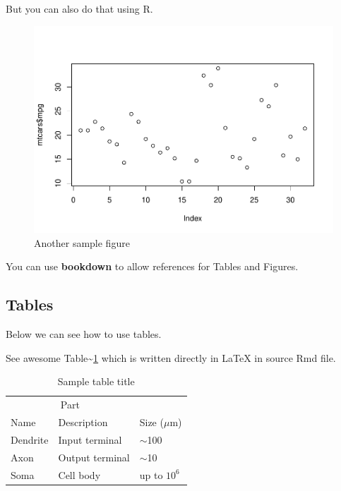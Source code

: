 \documentclass{article}
\newenvironment{Shaded}{\begin{snugshade}}{\end{snugshade}}
\newcommand{\FunctionTok}[1]{\textcolor[rgb]{0.00,0.00,0.00}{#1}}
\newcommand{\NormalTok}[1]{#1}
\newcommand{\SpecialCharTok}[1]{\textcolor[rgb]{0.00,0.00,0.00}{#1}}
\begin{document}
But you can also do that using R.

\begin{Shaded}
\end{Shaded}

\begin{figure}
\centering
\includegraphics{rticles-arxiv_files/figure-latex/fig2-1.pdf}
\caption{Another sample figure}
\end{figure}

You can use \textbf{bookdown} to allow references for Tables and
Figures.

\hypertarget{tables}{%
\subsection{Tables}\label{tables}}

Below we can see how to use tables.

See awesome Table\textasciitilde{}\ref{tab:table} which is written
directly in LaTeX in source Rmd file.

\begin{table}
 \caption{Sample table title}
  \centering
  \begin{tabular}{lll}
    \toprule
    \multicolumn{2}{c}{Part}                   \\
    \cmidrule(r){1-2}
    Name     & Description     & Size ($\mu$m) \\
    \midrule
    Dendrite & Input terminal  & $\sim$100     \\
    Axon     & Output terminal & $\sim$10      \\
    Soma     & Cell body       & up to $10^6$  \\
    \bottomrule
  \end{tabular}
  \label{tab:table}
\end{table}
\end{document}
